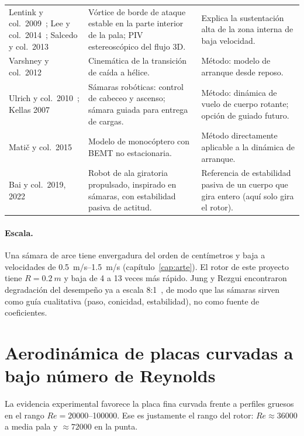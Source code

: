 \begin{table}[H]
\begin{tabularx}{\textwidth}{@{}>{\raggedright\arraybackslash}p{3.1cm} >{\raggedright\arraybackslash}Y >{\raggedright\arraybackslash}Y@{}}
Lentink y col.\ 2009~\cite{lentink2009}; Lee y col.\ 2014~\cite{literatura-lee2014}; Salcedo y col.\ 2013~\cite{literatura-salcedo2013} & Vórtice de borde de ataque estable en la parte interior de la pala; PIV estereoscópico del flujo 3D. & Explica la sustentación alta de la zona interna de baja velocidad.\\
Varshney y col.\ 2012~\cite{literatura-varshney2012} & Cinemática de la transición de caída a hélice. & Método: modelo de arranque desde reposo.\\
Ulrich y col.\ 2010~\cite{literatura-ulrich2010a,literatura-ulrich2010b}; Kellas 2007~\cite{literatura-kellas2007} & Sámaras robóticas: control de cabeceo y ascenso; sámara guiada para entrega de cargas. & Método: dinámica de vuelo de cuerpo rotante; opción de guiado futuro.\\
Matič y col.\ 2015~\cite{literatura-matic2015} & Modelo de monocóptero con BEMT no estacionaria. & Método directamente aplicable a la dinámica de arranque.\\
Bai y col.\ 2019, 2022~\cite{literatura-bai2019,literatura-bai2022} & Robot de ala giratoria propulsado, inspirado en sámaras, con estabilidad pasiva de actitud. & Referencia de estabilidad pasiva de un cuerpo que gira entero (aquí solo gira el rotor).\\
\bottomrule
\end{tabularx}
\end{table}

\paragraph{Escala.} Una sámara de arce tiene envergadura del orden de centímetros y baja
a velocidades de \SIrange{0.5}{1.5}{m/s} (capítulo~\ref{cap:arte}). El rotor de este
proyecto tiene $R=\SI{0.2}{m}$ y baja de 4 a 13 veces más rápido. Jung y Rezgui
encontraron degradación del desempeño ya a escala 8:1~\cite{literatura-jung2016}, de
modo que las sámaras sirven como guía cualitativa (paso, conicidad, estabilidad), no como
fuente de coeficientes.

\section{Aerodinámica de placas curvadas a bajo número de Reynolds}
\label{sec:literatura-lowre}
La evidencia experimental favorece la placa fina curvada frente a perfiles gruesos en el
rango $Re=\num{20000}$--\num{100000}. Ese es justamente el rango del rotor:
$Re\approx\num{36000}$ a media pala y $\approx\num{72000}$ en la punta.


